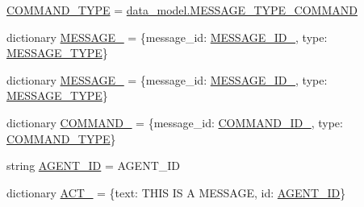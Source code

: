 \begin{DoxyCompactItemize}
\hyperlink{namespaceparlai_1_1mturk_1_1core_1_1test_1_1test__full__system_ad9950249f47f9604449cc37d36424edf}{C\+O\+M\+M\+A\+N\+D\+\_\+\+T\+Y\+PE} = \hyperlink{namespaceparlai_1_1mturk_1_1core_1_1data__model_a6750ce7f276954a237bd83a74170c57f}{data\+\_\+model.\+M\+E\+S\+S\+A\+G\+E\+\_\+\+T\+Y\+P\+E\+\_\+\+C\+O\+M\+M\+A\+ND}
\item 
dictionary \hyperlink{namespaceparlai_1_1mturk_1_1core_1_1test_1_1test__full__system_a2d21ea5ca6f406476013a4e629185213}{M\+E\+S\+S\+A\+G\+E\+\_} = \{\textquotesingle{}message\+\_\+id\textquotesingle{}\+: \hyperlink{namespaceparlai_1_1mturk_1_1core_1_1test_1_1test__full__system_af4c8bc21d78bcfe5a880215a87c1019b}{M\+E\+S\+S\+A\+G\+E\+\_\+\+I\+D\+\_}, \textquotesingle{}type\textquotesingle{}\+: \hyperlink{namespaceparlai_1_1mturk_1_1core_1_1test_1_1test__full__system_acf878fb471bb0af522f8f0a2020199c7}{M\+E\+S\+S\+A\+G\+E\+\_\+\+T\+Y\+PE}\}
\item 
dictionary \hyperlink{namespaceparlai_1_1mturk_1_1core_1_1test_1_1test__full__system_a27f238464a502321834daa93a793293f}{M\+E\+S\+S\+A\+G\+E\+\_} = \{\textquotesingle{}message\+\_\+id\textquotesingle{}\+: \hyperlink{namespaceparlai_1_1mturk_1_1core_1_1test_1_1test__full__system_a1fff7d388cae6b92e11cd4944c0ee06a}{M\+E\+S\+S\+A\+G\+E\+\_\+\+I\+D\+\_}, \textquotesingle{}type\textquotesingle{}\+: \hyperlink{namespaceparlai_1_1mturk_1_1core_1_1test_1_1test__full__system_acf878fb471bb0af522f8f0a2020199c7}{M\+E\+S\+S\+A\+G\+E\+\_\+\+T\+Y\+PE}\}
\item 
dictionary \hyperlink{namespaceparlai_1_1mturk_1_1core_1_1test_1_1test__full__system_ab71e1e38b0cb900778465ef195f9cbce}{C\+O\+M\+M\+A\+N\+D\+\_} = \{\textquotesingle{}message\+\_\+id\textquotesingle{}\+: \hyperlink{namespaceparlai_1_1mturk_1_1core_1_1test_1_1test__full__system_a7dfe23cde7a567a97f5219eb3f4c1e6a}{C\+O\+M\+M\+A\+N\+D\+\_\+\+I\+D\+\_}, \textquotesingle{}type\textquotesingle{}\+: \hyperlink{namespaceparlai_1_1mturk_1_1core_1_1test_1_1test__full__system_ad9950249f47f9604449cc37d36424edf}{C\+O\+M\+M\+A\+N\+D\+\_\+\+T\+Y\+PE}\}
\item 
string \hyperlink{namespaceparlai_1_1mturk_1_1core_1_1test_1_1test__full__system_a6f2c4ad9653ea52bfba270435d2731f7}{A\+G\+E\+N\+T\+\_\+\+ID} = \textquotesingle{}A\+G\+E\+N\+T\+\_\+\+ID\textquotesingle{}
\item 
dictionary \hyperlink{namespaceparlai_1_1mturk_1_1core_1_1test_1_1test__full__system_aeb9548f136e5c73b54d31138125ceaa3}{A\+C\+T\+\_} = \{\textquotesingle{}text\textquotesingle{}\+: \textquotesingle{}T\+H\+IS IS A M\+E\+S\+S\+A\+GE\textquotesingle{}, \textquotesingle{}id\textquotesingle{}\+: \hyperlink{namespaceparlai_1_1mturk_1_1core_1_1test_1_1test__full__system_a6f2c4ad9653ea52bfba270435d2731f7}{A\+G\+E\+N\+T\+\_\+\+ID}\}

\end{DoxyCompactItemize}

